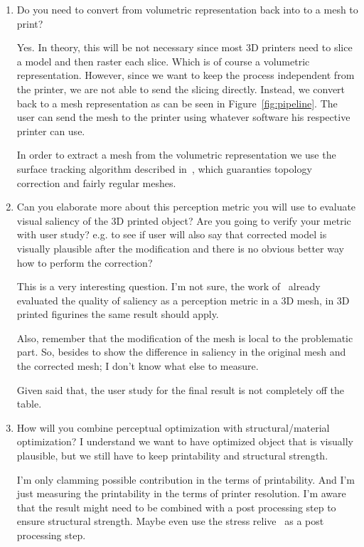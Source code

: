 \begin{enumerate}
  \item Do you need to convert from volumetric representation back into to a mesh to print?
	
	Yes. In theory, this will be not necessary since most 3D printers need to slice a model and then raster each slice. Which is of course a volumetric representation. However, since we want to keep the process independent from the printer, we are not able to send the slicing directly. Instead, we convert back to a mesh representation as can be seen in Figure~\ref{fig:pipeline}. The user can send the mesh to the printer using whatever software his respective printer can use.
	
	In order to extract a mesh from the volumetric representation we use the surface tracking algorithm described in~\cite{Artzy1980}, which guaranties topology correction and fairly regular meshes.
  
	\item Can you elaborate more about this perception metric you will use to evaluate visual saliency of the 3D printed object? Are you going to verify your metric with user study? e.g. to see if user will also say that corrected model is visually plausible after the modification and there is no obvious better way how to perform the correction?
	
	This is a very interesting question. I'm not sure, the work of~\cite{Kim2010} already evaluated the quality of saliency as a perception metric in a 3D mesh, in 3D printed figurines the same result should apply. 
	
	Also, remember that the modification of the mesh is local to the problematic part. So, besides to show the difference in saliency in the original mesh and the corrected mesh; I don't know what else to measure.
	
	Given said that, the user study for the final result is not completely off the table.
	
	\item How will you combine perceptual optimization with structural/material optimization? I understand we want to have optimized object that is visually plausible, but we still have to keep printability and structural strength.
	
	I’m only clamming possible contribution in the terms of printability. And I'm just measuring the printability in the terms of printer resolution. I'm aware that the result might need to be combined with a post processing step to ensure structural strength. Maybe even use the stress relive~\cite{Stava2012} as a post processing step.
	

\end{enumerate}
